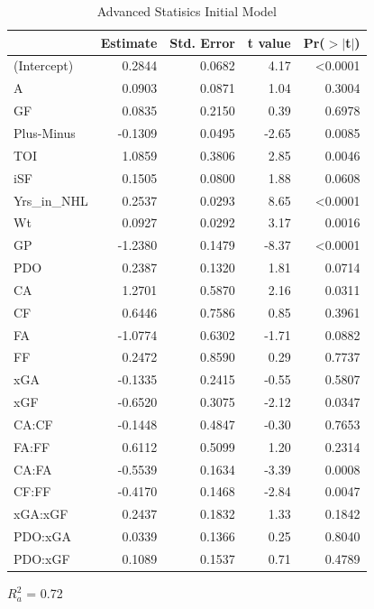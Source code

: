 \documentclass[10pt]{article}
\begin{document}
{{{{\begin{table}[tph]
\caption{Advanced Statisics Initial Model}
\label{tab:advanced}
\centering
\begin{threeparttable}
\begin{tabular}[t]{lrrrr}
  \toprule
  & Estimate & Std. Error & t value & Pr($>$$|$t$|$)\\
      \midrule
    (Intercept) & 0.2844 & 0.0682 & 4.17 & <0.0001 \\ 
    A & 0.0903 & 0.0871 & 1.04 & 0.3004 \\ 
    GF & 0.0835 & 0.2150 & 0.39 & 0.6978 \\ 
    Plus-Minus & -0.1309 & 0.0495 & -2.65 & 0.0085 \\ 
    TOI & 1.0859 & 0.3806 & 2.85 & 0.0046 \\ 
    iSF & 0.1505 & 0.0800 & 1.88 & 0.0608 \\ 
    Yrs\_in\_NHL & 0.2537 & 0.0293 & 8.65 & <0.0001 \\ 
    Wt & 0.0927 & 0.0292 & 3.17 & 0.0016 \\ 
    GP & -1.2380 & 0.1479 & -8.37 & <0.0001 \\ 
    PDO & 0.2387 & 0.1320 & 1.81 & 0.0714 \\ 
    CA & 1.2701 & 0.5870 & 2.16 & 0.0311 \\ 
    CF & 0.6446 & 0.7586 & 0.85 & 0.3961 \\
    FA & -1.0774 & 0.6302 & -1.71 & 0.0882 \\ 
    FF & 0.2472 & 0.8590 & 0.29 & 0.7737 \\ 
    xGA & -0.1335 & 0.2415 & -0.55 & 0.5807 \\ 
    xGF & -0.6520 & 0.3075 & -2.12 & 0.0347 \\ 
    CA:CF & -0.1448 & 0.4847 & -0.30 & 0.7653 \\ 
    FA:FF & 0.6112 & 0.5099 & 1.20 & 0.2314 \\ 
    CA:FA & -0.5539 & 0.1634 & -3.39 & 0.0008 \\ 
    CF:FF & -0.4170 & 0.1468 & -2.84 & 0.0047 \\ 
    xGA:xGF & 0.2437 & 0.1832 & 1.33 & 0.1842 \\ 
    PDO:xGA & 0.0339 & 0.1366 & 0.25 & 0.8040 \\ 
    PDO:xGF & 0.1089 & 0.1537 & 0.71 & 0.4789 \\ 
   \bottomrule
\end{tabular}
    \begin{tablenotes}
      \item $R^2_a$ = 0.72  %
    \end{tablenotes}
  \end{threeparttable}    
\end{table}

}}}}
\end{document}
